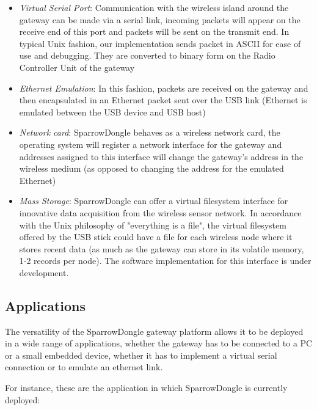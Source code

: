 \begin{itemize}

\item \textit{Virtual Serial Port}: Communication with the wireless island
around the gateway can be made via a serial link, incoming packets will appear
on the receive end of this port and packets will be sent on the transmit end.
In typical Unix fashion, our implementation sends packet in ASCII for ease of
use and debugging. They are converted to binary form on the Radio Controller
Unit of the gateway

\item \textit{Ethernet Emulation}: In this fashion, packets are received on the
gateway and then encapsulated in an Ethernet packet sent over the USB link
(Ethernet is emulated between the USB device and USB host)

\item \textit{Network card}: SparrowDongle behaves as a wireless network card,
the operating system will register a network interface for the gateway and
addresses assigned to this interface will change the gateway's address in the
wireless medium (as opposed to changing the address for the emulated Ethernet)

\item \textit{Mass Storage}: SparrowDongle can offer a virtual filesystem
interface for innovative data acquisition from the wireless sensor network. In
accordance with the Unix philosophy of "everything is a file", the virtual
filesystem offered by the USB stick could have a file for each wireless node
where it stores recent data (as much as the gateway can store in its volatile
memory, 1-2 records per node). The software implementation for this interface
is under development.

 \end{itemize}

\subsection{Applications}


The versatility of the SparrowDongle gateway platform allows it to be deployed
in a wide range of applications, whether the gateway has to be connected to a
PC or a small embedded device, whether it has to implement a virtual serial
connection or to emulate an ethernet link.

For instance, these are the application in which SparrowDongle is currently
deployed:

